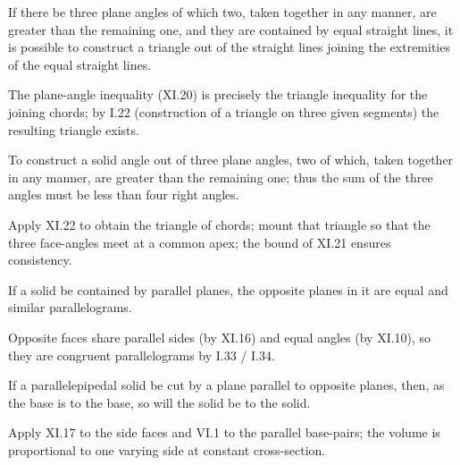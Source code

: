 \documentclass{rrxiv}
\begin{document}
\begin{claim}
\label{prop:XI.22}
If there be three plane angles of which two, taken together in any
manner, are greater than the remaining one, and they are contained
by equal straight lines, it is possible to construct a triangle out
of the straight lines joining the extremities of the equal straight
lines.
\end{claim}
\begin{evidence}[Proof of XI.22]
\label{ev:XI.22}
The plane-angle inequality (XI.20) is precisely the triangle
inequality for the joining chords; by I.22 (construction of a
triangle on three given segments) the resulting triangle exists.
\end{evidence}

\begin{claim}
\label{prop:XI.23}
To construct a solid angle out of three plane angles, two of which,
taken together in any manner, are greater than the remaining one;
thus the sum of the three angles must be less than four right angles.
\end{claim}
\begin{evidence}[Proof of XI.23]
\label{ev:XI.23}
Apply XI.22 to obtain the triangle of chords; mount that triangle so
that the three face-angles meet at a common apex; the bound of XI.21
ensures consistency.
\end{evidence}

\begin{claim}
\label{prop:XI.24}
If a solid be contained by parallel planes, the opposite planes in
it are equal and similar parallelograms.
\end{claim}
\begin{evidence}[Proof of XI.24]
\label{ev:XI.24}
Opposite faces share parallel sides (by XI.16) and equal angles (by
XI.10), so they are congruent parallelograms by I.33 / I.34.
\end{evidence}

\begin{claim}
\label{prop:XI.25}
If a parallelepipedal solid be cut by a plane parallel to opposite
planes, then, as the base is to the base, so will the solid be to
the solid.
\end{claim}
\begin{evidence}[Proof of XI.25]
\label{ev:XI.25}
Apply XI.17 to the side faces and VI.1 to the parallel base-pairs;
the volume is proportional to one varying side at constant
cross-section.
\end{evidence}
\end{document}
